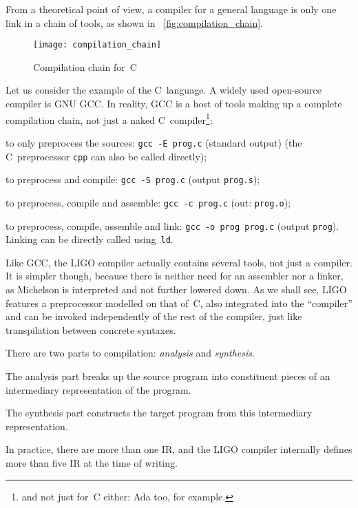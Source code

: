 \documentclass[12pt,a4paper]{article}
\begin{document}
From a theoretical point of view, a compiler for a general language is
only one link in a chain of tools, as shown in
\fig~\vref{fig:compilation_chain}.
\begin{figure}
\centering
\texttt{[image: compilation\_chain]}
\caption{Compilation chain for~C\label{fig:compilation_chain}}
\end{figure}
Let us consider the example of the C~language. A widely used
open\hyp{}source compiler is GNU GCC. In reality, GCC is a host of
tools making up a complete compilation chain, not just a naked
C~compiler\footnote{and not just for~C either: Ada too, for example.}:
\begin{itemize*}

  \item to only preprocess the sources: \texttt{gcc -E prog.c}
  (standard output) (the C~preprocessor \texttt{cpp} can also be
  called directly);

  \item to preprocess and compile: \texttt{gcc -S prog.c}
  (output \texttt{prog.s});

  \item to preprocess, compile and assemble: \texttt{gcc -c prog.c}
  (out: \texttt{prog.o});

  \item to preprocess, compile, assemble and link: \texttt{gcc -o prog
    prog.c} (output \texttt{prog}). Linking can be directly called
    using~\texttt{ld}.

\end{itemize*}
Like GCC, the LIGO compiler actually contains several tools, not just
a compiler. It is simpler though, because there is neither need for an
assembler nor a linker, as Michelson is interpreted and not further
lowered down. As we shall see, LIGO features a preprocessor modelled
on that of~C, also integrated into the ``compiler'' and can be invoked
independently of the rest of the compiler, just like transpilation
between concrete syntaxes.

There are two parts to compilation: \emph{analysis} and
\emph{synthesis}.
\begin{enumerate*}

  \item The analysis part breaks up the source program into
  constituent pieces of an intermediary representation of the
  program.

  \item The synthesis part constructs the target program from this
  intermediary representation.

\end{enumerate*}
In practice, there are more than one IR, and the LIGO compiler
internally defines more than five IR at the time of writing.
\end{document}

